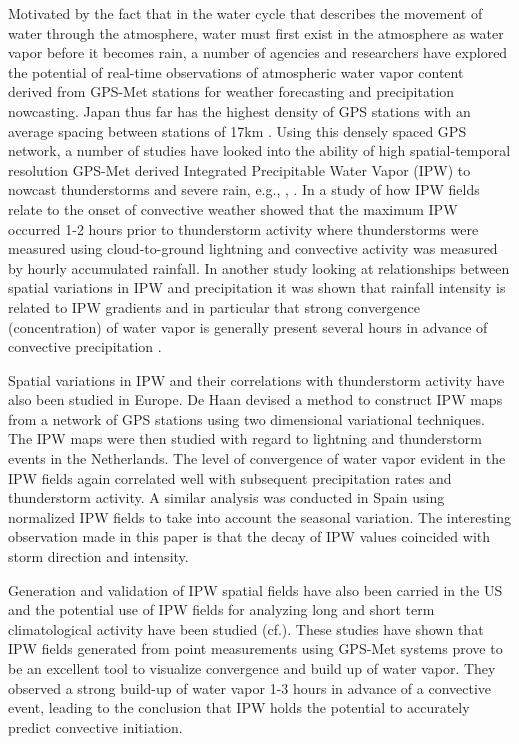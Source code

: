 \documentclass[proposal]{umassthesis}
\begin{document}
Motivated by the fact that in the water cycle that describes the movement of water through the atmosphere, water must first exist in the atmosphere as water vapor before it becomes rain, a number of agencies and researchers have explored the potential of real-time observations of atmospheric water vapor content derived from GPS-Met stations for weather forecasting and precipitation nowcasting. Japan thus far has the highest density of GPS stations with an average spacing between stations of 17km \cite{shoji2014estimation}. Using this densely spaced GPS network, a number of studies have looked into the ability of high spatial-temporal resolution GPS-Met derived Integrated Precipitable Water Vapor (IPW) to nowcast thunderstorms and severe rain, e.g., \cite{iwasaki2002diurnal}, \cite{seko2004meso}. In a study of how IPW fields relate to the onset of convective weather \cite{inoue2007characteristics} showed that the maximum IPW occurred 1-2 hours prior to thunderstorm activity where thunderstorms were measured using cloud-to-ground lightning and convective activity was measured by hourly accumulated rainfall. In another study looking at relationships between spatial variations in IPW and precipitation it was shown that rainfall intensity is related to IPW gradients and in particular that strong convergence (concentration) of water vapor is generally present several hours in advance of convective precipitation \cite{yoshinori2013retrieval}.

Spatial variations in IPW and their correlations with thunderstorm activity have also been studied in Europe. De Haan \cite{de2009real} devised a method to construct IPW maps from a network of GPS stations using two dimensional variational techniques. The IPW maps were then studied with regard to lightning and thunderstorm events in the Netherlands. The level of convergence of water vapor evident in the IPW fields again correlated well with subsequent precipitation rates and thunderstorm activity. A similar analysis was conducted in Spain \cite{terradellas2010use} using normalized IPW fields to take into account the seasonal variation. The interesting observation made in this paper is that the decay of IPW values coincided with storm direction and intensity.

Generation and validation of IPW spatial fields have also been carried in the US and the potential use of IPW fields for analyzing long and short term climatological activity have been studied (cf.\cite{radhakrishna2015precipitable}). These studies have shown that IPW fields generated from point measurements using GPS-Met systems prove to be an excellent tool to visualize convergence and build up of water vapor. They observed a strong build-up of water vapor 1-3 hours in advance of a convective event, leading to the conclusion that IPW holds the potential to accurately predict convective initiation.
\end{document}
